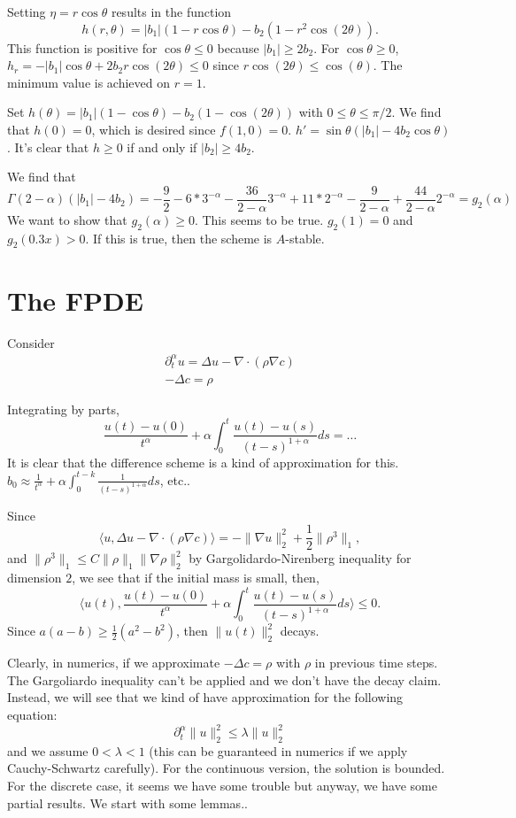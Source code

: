 \documentclass[11pt]{article}
\begin{document}
Setting $\eta=r\cos\theta$ results in the function $$
h(r,\theta)=|b_1|(1-r\cos\theta)-b_2(1-r^2\cos(2\theta)).
$$
This function is positive for $\cos\theta\le 0$ because $|b_1|\ge 2b_2$. For $\cos\theta\ge 0$, $h_r=-|b_1|\cos\theta+2b_2r\cos(2\theta)\le 0$ since $r\cos(2\theta)\le\cos(\theta)$. The minimum value is achieved on $r=1$. 

Set $h(\theta)=|b_1|(1-\cos\theta)-b_2(1-\cos(2\theta))$ with $0\le\theta\le \pi/2$. We find that $h(0)=0$, which is desired since $f(1,0)=0$. $h'=\sin\theta (|b_1|-4b_2\cos\theta)$.
It's clear that $h\ge 0$ if and only if $|b_2|\ge 4b_2$.

We find that $$
\Gamma(2-\alpha)(|b_1|-4b_2)=-\frac{9}{2}-6*3^{-\alpha}-\frac{36}{2-\alpha}3^{-\alpha}+11*2^{-\alpha}-\frac{9}{2-\alpha}
+\frac{44}{2-\alpha}2^{-\alpha}=g_2(\alpha)
$$
We want to show that $g_2(\alpha)\ge 0$. This seems to be true. $g_2(1)=0$ and $g_2(0.3x)>0$.  If this is true, then the scheme is $A$-stable.

\section{The FPDE}
Consider
\begin{gather*}
\partial^{\alpha}_tu=\Delta u-\nabla\cdot(\rho\nabla c)\\
-\Delta c=\rho
\end{gather*}

Integrating by parts, $$
\frac{u(t)-u(0)}{t^{\alpha}}+\alpha\int_0^t\frac{u(t)-u(s)}{(t-s)^{1+\alpha}}ds
=\ldots
$$
It is clear that the difference scheme is a kind of approximation for this.
$b_0\approx \frac{1}{t^{\alpha}}+\alpha\int_0^{t-k}\frac{1}{(t-s)^{1+\alpha}}ds$, etc..

Since $$
\langle u, \Delta u-\nabla\cdot(\rho\nabla c)\rangle
=-\|\nabla u\|_2^2+\frac{1}{2}\|\rho^3\|_1,
$$
and $\|\rho^3\|_1\le C\|\rho\|_1\|\nabla\rho\|_2^2$ by Gargolidardo-Nirenberg inequality for dimension $2$, we see that if the initial mass is small, then, 
 $$
\langle u(t), \frac{u(t)-u(0)}{t^{\alpha}}+\alpha\int_0^t\frac{u(t)-u(s)}{(t-s)^{1+\alpha}}ds\rangle\le 0. 
$$
Since $a(a-b)\ge \frac{1}{2}(a^2-b^2)$, then $\|u(t)\|_2^2$ decays.

Clearly, in numerics, if we approximate $-\Delta c=\rho$ with $\rho$ in previous time steps. The Gargoliardo inequality can't be applied and we don't have the decay claim. Instead, we will see that we kind of have approximation for the following equation: $$
\partial^{\alpha}_t\|u\|_2^2\le \lambda \|u\|_2^2
$$
and we assume $0<\lambda <1$ (this can be guaranteed in numerics if we apply Cauchy-Schwartz carefully). For the continuous version, the solution is bounded. For the discrete case, it seems we have some trouble but anyway, we have some partial results. We start with some lemmas..
\end{document}
